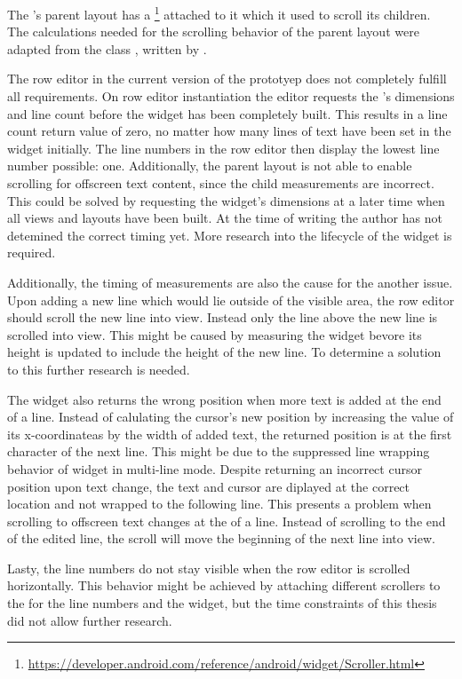 The 's parent layout has a \footnote{\url{https://developer.android.com/reference/android/widget/Scroller.html}}  attached to it which it used to scroll its children. The calculations needed for the scrolling behavior of the parent layout were adapted from the class , written by \cite{clark2010}. 

The row editor in the current version of the prototyep does not completely fulfill all requirements. On row editor instantiation the editor requests the 's dimensions and line count before the widget has been completely built. This results in a line count return value of zero, no matter how many lines of text have been set in the widget initially. The line numbers in the row editor then display the lowest line number possible: one. Additionally, the parent layout is not able to enable scrolling for offscreen text content, since the child measurements are incorrect. This could be solved by requesting the  widget's dimensions at a later time when all views and layouts have been built. At the time of writing the author has not detemined the correct timing yet. More research into the lifecycle of the widget is required.

Additionally, the timing of measurements are also the cause for the another issue. Upon adding a new line which would lie outside of the visible area, the row editor should scroll the new line into view. Instead only the line above the new line is scrolled into view. This might be caused by measuring the  widget bevore its height is updated to include the height of the new line. To determine a solution to this further research is needed.

The  widget also returns the wrong position when more text is added at the end of a line. Instead of calulating the cursor's new position by increasing the value of its x-coordinateas by the width of added text, the returned position is at the first character of the next line. This might be due to the suppressed line wrapping behavior of  widget in multi-line mode. Despite returning an incorrect cursor position upon text change, the text and cursor are diplayed at the correct location and not wrapped to the following line. This presents a problem when scrolling to offscreen text changes at the of a line. Instead of scrolling to the end of the edited line, the scroll will move the beginning of the next line into view.

Lasty, the line numbers do not stay visible when the row editor is scrolled horizontally. This behavior might be achieved by attaching different scrollers to the  for the line numbers and the  widget, but the time constraints of this thesis did not allow further research. 


